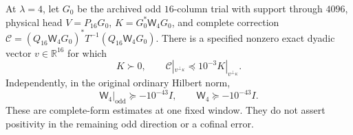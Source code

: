 \begin{proposition}
\label{prop:v126-odd-complement}
At $\lambda=4$, let $G_0$ be the archived odd $16$-column trial
with support through $4096$, physical head $V=P_{16}G_0$,
$K=G_0^*\mathsf W_4G_0$, and complete correction
$\mathcal C=(Q_{16}\mathsf W_4G_0)^*T^{-1}
                (Q_{16}\mathsf W_4G_0)$.
There is a specified nonzero exact dyadic vector $v\in\mathbb R^{16}$
for which
\begin{equation}\label{eq:v126-complement}
 K\succ0,\qquad
 \mathcal C|_{v^{\perp_K}}\preceq10^{-3}K|_{v^{\perp_K}}.
\end{equation}
Independently, in the original ordinary Hilbert norm,
\begin{equation}\label{eq:v126-ordinary-error}
 \mathsf W_4|_{\mathrm{odd}}\succeq-10^{-43}I,
 \qquad \mathsf W_4\succeq-10^{-43}I.
\end{equation}
These are complete-form estimates at one fixed window. They do not
assert positivity in the remaining odd direction or a cofinal error.
\end{proposition}

